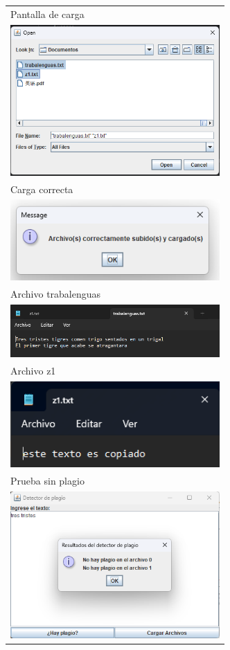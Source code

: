 \documentclass[9pt]{article}
\begin{document}
\begin{longtable}{|p{15cm}|}
		Pantalla de carga\\
		\includegraphics[width=8cm]{img/carga.png}\\
		Carga correcta\\
		\includegraphics[width=8cm]{img/carga-correcta.png}\\
		Archivo trabalenguas\\
		\includegraphics[width=8cm]{img/trabalenguas.png}\\
		Archivo z1\\
		\includegraphics[width=8cm]{img/z1.png}\\
		Prueba sin plagio\\
		\includegraphics[width=8cm]{img/prueba1.png}\\

\end{longtable}
\end{document}
